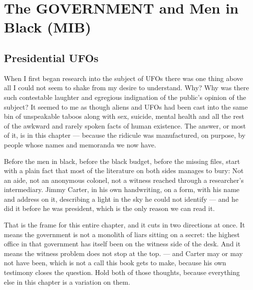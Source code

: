 \chapter{The GOVERNMENT and Men in Black (MIB)}\label{ch:government}


\section{Presidential UFOs}\label{sec:presidentialufos}

When I first began research into the subject of UFOs there was one thing above all I could not
seem to shake from my desire to understand. Why? Why was there such contestable laughter and
egregious indignation of the public's opinion of the subject? It seemed to me as though aliens
and UFOs had been cast into the same bin of unspeakable taboos along with sex, suicide, mental
health and all the rest of the awkward and rarely spoken facts of human existence. The answer,
or most of it, is in this chapter --- because the ridicule was manufactured, on purpose, by
people whose names and memoranda we now have.

Before the men in black, before the black budget, before the missing files, start with a plain fact that most of the literature on both sides manages to bury:  Not an aide, not an anonymous colonel, not a witness reached
through a researcher's intermediary. Jimmy Carter, in his own handwriting, on a form, with his
name and address on it, describing a light in the sky he could not identify --- and he did it
before he was president, which is the only reason we can read it.

That is the frame for this entire chapter, and it cuts in two directions at once. It means the
government is not a monolith of liars sitting on a secret: the highest office in that
government has itself been on the witness side of the desk. And it means the witness problem
does not stop at the top.  --- and Carter may or may not have been, which is not a
call this book gets to make, because his own testimony closes the question. Hold both of those
thoughts, because everything else in this chapter is a variation on them.

